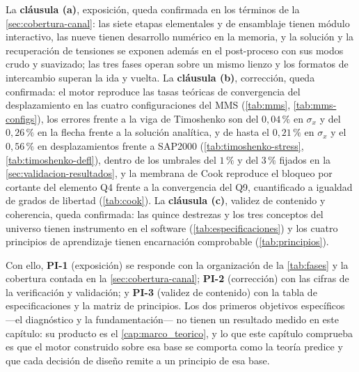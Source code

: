 La \textbf{cláusula (a)}, exposición, queda confirmada en los términos de la \autoref{sec:cobertura-canal}: las siete etapas elementales y de ensamblaje tienen módulo interactivo, las nueve tienen desarrollo numérico en la memoria, y la solución y la recuperación de tensiones se exponen además en el post-proceso con sus modos crudo y suavizado; las tres fases operan sobre un mismo lienzo y los formatos de intercambio superan la ida y vuelta. La \textbf{cláusula (b)}, corrección, queda confirmada: el motor reproduce las tasas teóricas de convergencia del desplazamiento en las cuatro configuraciones del MMS (\autoref{tab:mms}, \autoref{tab:mms-configs}), los errores frente a la viga de Timoshenko son del $0{,}04\,\%$ en $\sigma_x$ y del $0{,}26\,\%$ en la flecha frente a la solución analítica, y de hasta el $0{,}21\,\%$ en $\sigma_x$ y el $0{,}56\,\%$ en desplazamientos frente a SAP2000 (\autoref{tab:timoshenko-stress}, \autoref{tab:timoshenko-defl}), dentro de los umbrales del $1\,\%$ y del $3\,\%$ fijados en la \autoref{sec:validacion-resultados}, y la membrana de Cook reproduce el bloqueo por cortante del elemento Q4 frente a la convergencia del Q9, cuantificado a igualdad de grados de libertad (\autoref{tab:cook}). La \textbf{cláusula (c)}, validez de contenido y coherencia, queda confirmada: las quince destrezas y los tres conceptos del universo tienen instrumento en el software (\autoref{tab:especificaciones}) y los cuatro principios de aprendizaje tienen encarnación comprobable (\autoref{tab:principios}).

Con ello, \textbf{PI-1} (exposición) se responde con la organización de la \autoref{tab:fases} y la cobertura contada en la \autoref{sec:cobertura-canal}; \textbf{PI-2} (corrección) con las cifras de la verificación y validación; y \textbf{PI-3} (validez de contenido) con la tabla de especificaciones y la matriz de principios. Los dos primeros objetivos específicos —el diagnóstico y la fundamentación— no tienen un resultado medido en este capítulo: su producto es el \autoref{cap:marco_teorico}, y lo que este capítulo comprueba es que el motor construido sobre esa base se comporta como la teoría predice y que cada decisión de diseño remite a un principio de esa base.


